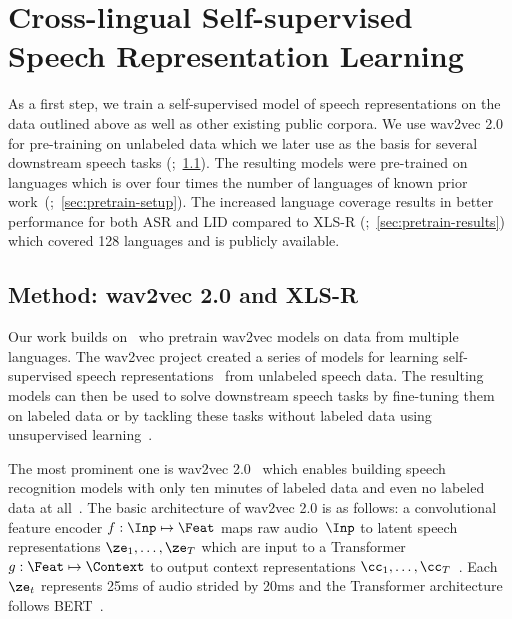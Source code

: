 \section{Cross-lingual Self-supervised Speech Representation Learning}
\label{sec:pretrain}

As a first step, we train a self-supervised model of speech representations on the data outlined above as well as other existing public corpora. 
We use wav2vec 2.0 for pre-training on unlabeled data which we later use as the basis for several downstream speech tasks (\citealt{baevski2020wav};~\textsection\ref{sec:pretrain-w2v}).
The resulting models were pre-trained on \numptlang{} languages which is over four times the number of languages of known prior work~(\citealt{zhang2023usm};~\textsection\ref{sec:pretrain-setup}).
The increased language coverage results in better performance for both ASR and LID compared to XLS-R (\citealt{babu22_interspeech};~\textsection\ref{sec:pretrain-results}) which covered 128 languages and is publicly available.


\subsection{Method: wav2vec 2.0 and XLS-R}
\label{sec:pretrain-w2v}

Our work builds on~\citet{babu22_interspeech} who pretrain wav2vec models on data from multiple languages.
The wav2vec project created a series of models for learning self-supervised speech representations~\citep{schneider2019wav2vec,baevski2019vqwav2vec,baevski2020wav} from unlabeled speech data.
The resulting models can then be used to solve downstream speech tasks by fine-tuning them on labeled data or by tackling these tasks without labeled data using unsupervised learning~\citep{baevski2021unsupervised,liu2022endtoend}.

The most prominent one is wav2vec 2.0~\citep{baevski2020wav} which enables building speech recognition models with only ten minutes of labeled data and even no labeled data at all~\citep{baevski2021unsupervised}.
The basic architecture of wav2vec 2.0 is as follows: a convolutional feature encoder $f: \Inp \mapsto \Feat$ maps raw audio~$\Inp$ to latent speech representations $\ze_1, \dots, \ze_T$ which are input to a Transformer $g: \Feat \mapsto \Context$ to output context representations $\cc_1, \dots, \cc_T$~\citep{baevski2019vqwav2vec}.
Each $\ze_t$ represents 25ms of audio strided by 20ms and the Transformer architecture follows BERT~\citep{vaswani2017transformer,devlin2018bert}.

